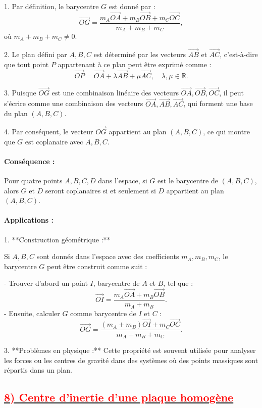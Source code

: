 \documentclass{article}
\begin{document}
1. Par définition, le barycentre \( G \) est donné par :  
   \[
   \overrightarrow{OG} = \frac{m_A\overrightarrow{OA} + m_B\overrightarrow{OB} + m_C\overrightarrow{OC}}{m_A + m_B + m_C},
   \]
   où \( m_A + m_B + m_C \neq 0 \).

2. Le plan défini par \( A, B, C \) est déterminé par les vecteurs \( \overrightarrow{AB} \) et \( \overrightarrow{AC} \), c'est-à-dire que tout point \( P \) appartenant à ce plan peut être exprimé comme :  
   \[
   \overrightarrow{OP} = \overrightarrow{OA} + \lambda \overrightarrow{AB} + \mu \overrightarrow{AC}, \quad \lambda, \mu \in \mathbb{R}.
   \]

3. Puisque \( \overrightarrow{OG} \) est une combinaison linéaire des vecteurs \( \overrightarrow{OA}, \overrightarrow{OB}, \overrightarrow{OC} \), il peut s'écrire comme une combinaison des vecteurs \( \overrightarrow{OA}, \overrightarrow{AB}, \overrightarrow{AC} \), qui forment une base du plan \( (A, B, C) \).

4. Par conséquent, le vecteur \( \overrightarrow{OG} \) appartient au plan \( (A, B, C) \), ce qui montre que \( G \) est coplanaire avec \( A, B, C \).

\paragraph{Conséquence :}  
Pour quatre points \( A, B, C, D \) dans l’espace, si \( G \) est le barycentre de \( (A, B, C) \), alors \( G \) et \( D \) seront coplanaires si et seulement si \( D \) appartient au plan \( (A, B, C) \).

\paragraph{Applications :}  

1. **Construction géométrique :**  

   Si \( A, B, C \) sont donnés dans l’espace avec des coefficients \( m_A, m_B, m_C \), le barycentre \( G \) peut être construit comme suit :  
   
   - Trouver d’abord un point \( I \), barycentre de \( A \) et \( B \), tel que :  
     \[
     \overrightarrow{OI} = \frac{m_A \overrightarrow{OA} + m_B \overrightarrow{OB}}{m_A + m_B}.
     \]
   - Ensuite, calculer \( G \) comme barycentre de \( I \) et \( C \) :  
     \[
     \overrightarrow{OG} = \frac{(m_A + m_B)\overrightarrow{OI} + m_C \overrightarrow{OC}}{m_A + m_B + m_C}.
     \]

3. **Problèmes en physique :**  
   Cette propriété est souvent utilisée pour analyser les forces ou les centres de gravité dans des systèmes où des points massiques sont répartis dans un plan.


\subsection*{\underline{\textbf{\textcolor{red}{8) Centre d’inertie d’une plaque homogène}}}}

		
\end{document}
